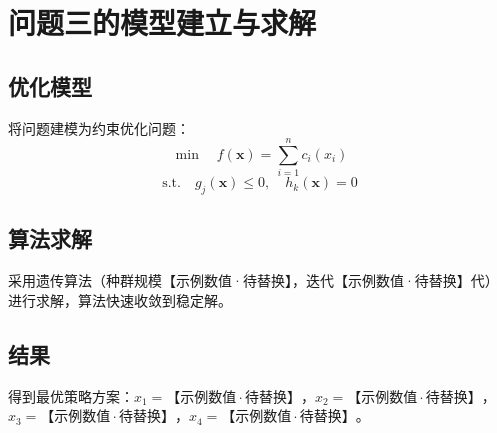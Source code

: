 \section{问题三的模型建立与求解}

\subsection{优化模型}

将问题建模为约束优化问题：
\[
  \min \quad f(\mathbf{x}) = \sum_{i=1}^{n} c_i(x_i)
\]
\[
  \text{s.t.} \quad g_j(\mathbf{x}) \le 0, \quad h_k(\mathbf{x}) = 0
\]

\subsection{算法求解}

采用遗传算法（种群规模【示例数值·待替换】，迭代【示例数值·待替换】代）进行求解，算法快速收敛到稳定解。

\subsection{结果}

得到最优策略方案：$x_1 = 【示例数值·待替换】$，$x_2 = 【示例数值·待替换】$，$x_3 = 【示例数值·待替换】$，$x_4 = 【示例数值·待替换】$。
